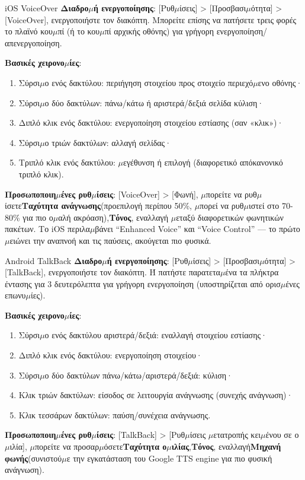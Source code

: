 \begin{tcbinfo}{iOS VoiceOver}
\textbf{Διαδρο$\mu$ή ενεργοποίησης}: [Ρυθ$\mu$ίσεις] > [Προσβασι$\mu$ότητα] > [VoiceOver], ενεργοποιήστε τον διακόπτη. Μπορείτε επίσης να πατήσετε τρεις φορές το πλαϊνό κου$\mu$πί (ή το κου$\mu$πί αρχικής οθόνης) για γρήγορη ενεργοποίηση/απενεργοποίηση.

\textbf{Βασικές χειρονο$\mu$ίες}:

\begin{enumerate}
  \item Σύρσι$\mu$ο ενός δακτύλου: περιήγηση στοιχείου προς στοιχείο περιεχό$\mu$ενο οθόνης·
  \item Σύρσι$\mu$ο δύο δακτύλων: πάνω/κάτω ή αριστερά/δεξιά σελίδα κύλιση·
  \item Διπλό κλικ ενός δακτύλου: ενεργοποίηση στοιχείου εστίασης (σαν «κλικ»)·
  \item Σύρσι$\mu$ο τριών δακτύλων: αλλαγή σελίδας·
  \item Τριπλό κλικ ενός δακτύλου: $\mu$εγέθυνση ή επιλογή (διαφορετικό απόκανονικό τριπλό κλικ).
\end{enumerate}

\textbf{Προσωποποιη$\mu$ένες ρυθ$\mu$ίσεις}: [VoiceOver] > [Φωνή], $\mu$πορείτε να ρυθ$\mu$ίσετε\textbf{Ταχύτητα ανάγνωσης}(προεπιλογή περίπου 50\%, $\mu$πορεί να ρυθ$\mu$ιστεί στο 70-80\% για πιο ο$\mu$αλή ακρόαση),\textbf{Τόνος}, εναλλαγή $\mu$εταξύ διαφορετικών φωνητικών πακέτων. Το iOS περιλα$\mu$βάνει “Enhanced Voice” και “Voice Control” — το πρώτο $\mu$ειώνει την αναπνοή και τις παύσεις, ακούγεται πιο φυσικά.

\end{tcbinfo}

\begin{tcbinfo}{Android TalkBack}
\textbf{Διαδρο$\mu$ή ενεργοποίησης}: [Ρυθ$\mu$ίσεις] > [Προσβασι$\mu$ότητα] > [TalkBack], ενεργοποιήστε τον διακόπτη. Ή πατήστε παρατετα$\mu$ένα τα πλήκτρα έντασης για 3 δευτερόλεπτα για γρήγορη ενεργοποίηση (υποστηρίζεται από ορισ$\mu$ένες επωνυ$\mu$ίες).

\textbf{Βασικές χειρονο$\mu$ίες}:

\begin{enumerate}
  \item Σύρσι$\mu$ο ενός δακτύλου αριστερά/δεξιά: εναλλαγή στοιχείου εστίασης·
  \item Διπλό κλικ ενός δακτύλου: ενεργοποίηση στοιχείου·
  \item Σύρσι$\mu$ο δύο δακτύλων πάνω/κάτω/αριστερά/δεξιά: κύλιση·
  \item Κλικ τριών δακτύλων: είσοδος σε λειτουργία ανάγνωσης (συνεχής ανάγνωση)·
  \item Κλικ τεσσάρων δακτύλων: παύση/συνέχεια ανάγνωσης.
\end{enumerate}

\textbf{Προσωποποιη$\mu$ένες ρυθ$\mu$ίσεις}: [TalkBack] > [Ρυθ$\mu$ίσεις $\mu$ετατροπής κει$\mu$ένου σε ο$\mu$ιλία], $\mu$πορείτε να προσαρ$\mu$όσετε\textbf{Ταχύτητα ο$\mu$ιλίας},\textbf{Τόνος}, εναλλαγή\textbf{Μηχανή φωνής}(συνιστού$\mu$ε την εγκατάσταση του Google TTS engine για πιο φυσική ανάγνωση).

\end{tcbinfo}

